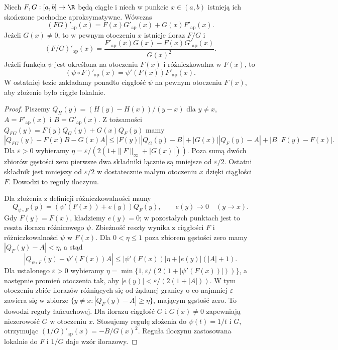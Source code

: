 \begin{lemat}
\label{it:lem:approx-derivative-calculus}
Niech $F,G:[a,b]\to\R$ będą ciągłe i niech w punkcie
$x\in(a,b)$ istnieją ich skończone pochodne aproksymatywne.
Wówczas
\[
 (FG)'_{\mathrm{ap}}(x)
 =F(x)G'_{\mathrm{ap}}(x)+G(x)F'_{\mathrm{ap}}(x).
\]
Jeżeli $G(x)\ne0$, to w pewnym otoczeniu $x$ istnieje
iloraz $F/G$ i
\[
 (F/G)'_{\mathrm{ap}}(x)=
 \frac{F'_{\mathrm{ap}}(x)G(x)-F(x)G'_{\mathrm{ap}}(x)}{G(x)^2}.
\]
Jeżeli funkcja $\psi$ jest określona na otoczeniu $F(x)$
i różniczkowalna w $F(x)$, to
\[
 (\psi\circ F)'_{\mathrm{ap}}(x)=\psi'(F(x))F'_{\mathrm{ap}}(x).
\]
W ostatniej tezie zakładamy ponadto ciągłość $\psi$ na
pewnym otoczeniu $F(x)$, aby złożenie było ciągłe lokalnie.
\end{lemat}
\begin{proof}
Piszemy $Q_H(y)=(H(y)-H(x))/(y-x)$ dla $y\ne x$,
$A=F'_{\mathrm{ap}}(x)$ i $B=G'_{\mathrm{ap}}(x)$.
Z tożsamości $Q_{FG}(y)=F(y)Q_G(y)+G(x)Q_F(y)$ mamy
\[
 |Q_{FG}(y)-F(x)B-G(x)A|
 \le |F(y)||Q_G(y)-B|+|G(x)||Q_F(y)-A|
       +|B||F(y)-F(x)|.
\]
Dla $\varepsilon>0$ wybieramy
$\eta=\varepsilon/(2(1+\|F\|_\infty+|G(x)|))$.
Poza sumą dwóch zbiorów gęstości zero pierwsze dwa
składniki łącznie są mniejsze od $\varepsilon/2$.
Ostatni składnik jest mniejszy od $\varepsilon/2$
w dostatecznie małym otoczeniu $x$ dzięki ciągłości $F$.
Dowodzi to reguły iloczynu.

Dla złożenia z definicji różniczkowalności mamy
\[
 Q_{\psi\circ F}(y)=(\psi'(F(x))+e(y))Q_F(y),
 \qquad e(y)\longrightarrow0 \quad(y\to x).
\]
Gdy $F(y)=F(x)$, kładziemy $e(y)=0$; w pozostałych
punktach jest to reszta ilorazu różnicowego $\psi$.
Zbieżność reszty wynika z ciągłości $F$ i różniczkowalności
$\psi$ w $F(x)$. Dla $0<\eta\le1$ poza zbiorem gęstości
zero mamy $|Q_F(y)-A|<\eta$, a stąd
\[
 |Q_{\psi\circ F}(y)-\psi'(F(x))A|
 \le |\psi'(F(x))|\eta+|e(y)|(|A|+1).
\]
Dla ustalonego $\varepsilon>0$ wybieramy
$\eta=\min\{1,\varepsilon/(2(1+|\psi'(F(x))|))\}$,
a następnie promień otoczenia tak, aby
$|e(y)|<\varepsilon/(2(1+|A|))$. W tym otoczeniu
zbiór ilorazów różniących się od żądanej granicy
o co najmniej $\varepsilon$ zawiera się w zbiorze
$\{y\ne x:|Q_F(y)-A|\ge\eta\}$, mającym gęstość zero.
To dowodzi reguły łańcuchowej.
Dla ilorazu ciągłość $G$ i $G(x)\ne0$ zapewniają
niezerowość $G$ w otoczeniu $x$. Stosujemy regułę
złożenia do $\psi(t)=1/t$ i $G$, otrzymując
$(1/G)'_{\mathrm{ap}}(x)=-B/G(x)^2$.
Reguła iloczynu zastosowana lokalnie do $F$ i $1/G$
daje wzór ilorazowy.
\end{proof}

